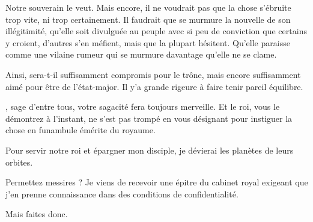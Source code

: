 \begin{drama}
  \generalspeaks Notre souverain le veut. Mais encore, il ne voudrait pas que la chose s’ébruite trop vite, ni trop certainement. Il faudrait que se murmure la nouvelle de son illégitimité, qu’elle soit divulguée au peuple avec si peu de conviction que certains y croient, d’autres s’en méfient, mais que la plupart hésitent. Qu’elle paraisse comme une vilaine rumeur qui se murmure davantage qu’elle ne se clame.

  \alexasspeaks Ainsi,  sera-t-il suffisamment compromis pour le trône, mais encore suffisamment aimé pour être de l’état-major. Il y’a grande rigeure à faire tenir pareil équilibre.

  \generalspeaks \alexas, sage d’entre tous, votre sagacité fera toujours merveille. Et le roi, vous le démontrez à l’instant, ne s’est pas trompé en  vous désignant pour instiguer la chose en funambule émérite du royaume.

  \alexasspeaks Pour servir notre roi et épargner mon disciple, je dévierai les planètes de leurs orbites.


  \alexasspeaks Permettez messires ? Je viens de recevoir une épitre du cabinet royal exigeant que  j’en prenne connaissance dans des conditions de confidentialité.

  \generalspeaks Mais faites donc.
\end{drama}

\scene

\StageDirII{\elena, \general}


